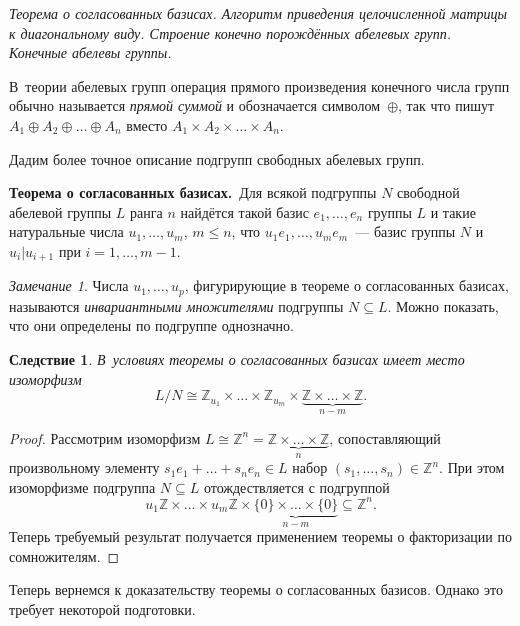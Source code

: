 \documentclass[a4paper,10pt]{amsart}
\def\ZZ{{\mathbb Z}}%
\newtheorem{corollary}{Следствие}
\theoremstyle{definition}
\theoremstyle{remark}
\newtheorem{remark}{Замечание}
\begin{document}
\medskip

{\it Теорема о согласованных базисах. Алгоритм
приведения целочисленной матрицы к диагональному виду. Строение конечно порождённых абелевых групп. Конечные абелевы группы. } %

В~теории абелевых групп операция прямого произведения конечного
числа групп обычно называется \textit{прямой суммой} и обозначается
символом~$\oplus$, так что пишут $A_1 \oplus A_2 \oplus \ldots
\oplus A_n$ вместо $A_1 \times A_2 \times \ldots \times A_n$.

Дадим более точное описание подгрупп свободных абелевых групп.

\smallskip

{\bf Теорема о согласованных базисах.}\ Для всякой подгруппы $N$
свободной абелевой группы $L$ ранга $n$ найдётся такой базис $e_1,
\ldots, e_n$ группы $L$ и такие натуральные числа $u_1, \ldots,
u_m$, $m \leqslant n$, что $u_1 e_1, \ldots, u_m e_m$~--- базис
группы $N$ и $u_i | u_{i+1}$ при $i = 1, \ldots, m-1$.

\smallskip

\begin{remark}
Числа $u_1, \ldots, u_p$, фигурирующие в теореме о согласованных
базисах, называются {\it инвариантными множителями} подгруппы $N
\subseteq L$. Можно показать, что они определены по подгруппе
однозначно.
\end{remark}

\begin{corollary}
В~условиях теоремы о согласованных базисах имеет место изоморфизм
$$
L / N \cong \ZZ_{u_1} \times \ldots \times \ZZ_{u_m} \times
\underbrace{\ZZ \times \ldots \times \ZZ}_{n - m}.
$$
\end{corollary}

\begin{proof}
Рассмотрим изоморфизм $L \cong \ZZ^n = \underbrace{\ZZ \times \ldots
\times \ZZ}_n$, сопоставляющий произвольному элементу $s_1 e_1 +
\ldots + s_n e_n \in L$ набор $(s_1, \ldots, s_n) \in \ZZ^n$. При
этом изоморфизме подгруппа $N \subseteq L$ отождествляется с
подгруппой
$$
u_1 \ZZ \times \ldots \times u_m \ZZ \times \underbrace{\lbrace 0
\rbrace \times \ldots \times \lbrace 0 \rbrace}_{n-m} \subseteq
\ZZ^n.
$$
Теперь требуемый результат получается применением теоремы о
факторизации по сомножителям.
\end{proof}

Теперь вернемся к доказательству теоремы о согласованных базисов.
Однако это требует некоторой подготовки.
\end{document}
